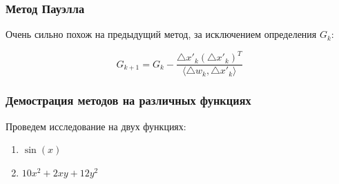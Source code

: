 \documentclass[a4paper, 14pt]{article}
\begin{document}
\subsubsection*{Метод Пауэлла}
Очень сильно похож на предыдущий метод, за исключением определения $G_k$:

\[G_{k + 1} = G_k - \frac{\triangle x'_k (\triangle x'_k)^T}{\langle \triangle w_k, \triangle x'_k \rangle} \] 


\subsubsection*{Демострация методов на различных функциях}
	Проведем исследование на двух функциях:
	\begin{enumerate}
	\item 	 $\sin(x)$ 
	\item  $10x^2 + 2xy + 12y^2$ 
\end{enumerate}
\end{document}
